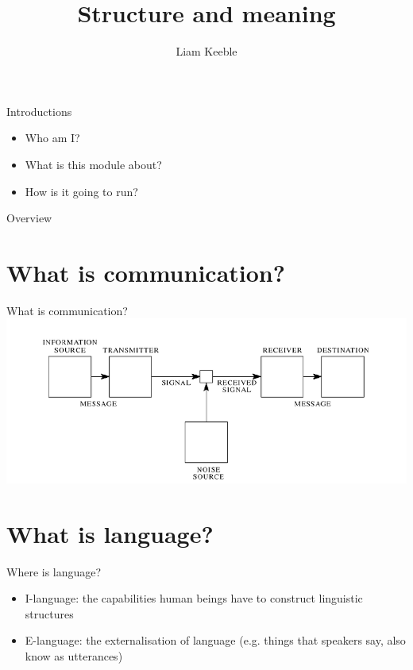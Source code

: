 \documentclass{beamer}
\title{Structure and meaning}
\author{Liam Keeble}
\institute{School of English Literature, Language and Linguistics}
\date{}
\begin{document}
\frame{\titlepage}

\begin{frame}{Introductions}
\begin{itemize}
\item Who am I?
\item What is this module about?
\item How is it going to run?
\end{itemize}
\end{frame}

\begin{frame}{Overview}
\tableofcontents
\end{frame}

\section{What is communication?}

\begin{frame}{What is communication?}
\includegraphics[scale=0.4]{shannon.png}
\nocite{shannon1948mathematical}
\end{frame}


\section{What is language?}

\begin{frame}{Where is language?}
	\begin{itemize}
	\item I-language: the capabilities human beings have to construct linguistic structures
	\item E-language: the externalisation of language (e.g. things that speakers say, also know as utterances)
	\end{itemize}

\end{frame}
\end{document}
